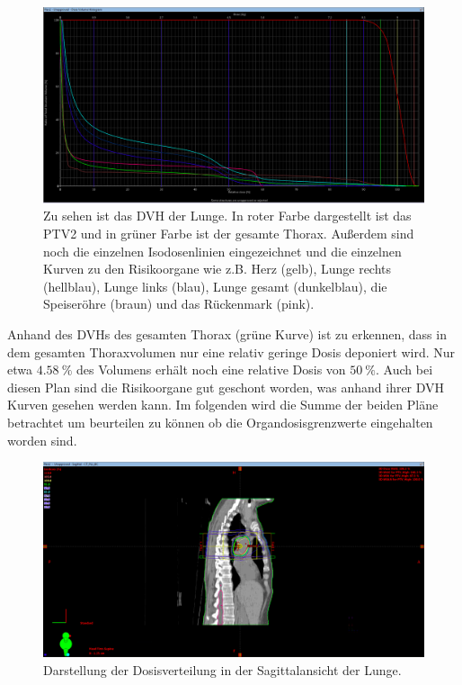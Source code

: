 \begin{figure}[H]
	\centering
	\includegraphics[width=\linewidth]{Bilder/Lunge2_DVH}
	\caption{Zu sehen ist das DVH der Lunge. In roter Farbe dargestellt ist das PTV2 und in grüner Farbe ist der gesamte Thorax. Außerdem sind noch die einzelnen Isodosenlinien eingezeichnet und die einzelnen Kurven zu den Risikoorgane wie z.B. Herz (gelb), Lunge rechts (hellblau), Lunge links (blau), Lunge gesamt (dunkelblau), die Speiseröhre (braun) und das Rückenmark (pink).}
	\label{fig:lunge2dvh}
\end{figure}

Anhand des DVHs des gesamten Thorax (grüne Kurve) ist zu erkennen, dass in dem gesamten Thoraxvolumen nur eine relativ geringe Dosis deponiert wird.
Nur etwa $\SI{4,58}{\percent}$ des Volumens erhält noch eine relative Dosis von $\SI{50}{\percent}$.
Auch bei diesen Plan sind die Risikoorgane gut geschont worden, was anhand ihrer DVH Kurven gesehen werden kann.
Im folgenden wird die Summe der beiden Pläne betrachtet um beurteilen zu können ob die Organdosisgrenzwerte eingehalten worden sind.

\begin{figure}[H]
	\centering
	\includegraphics[width=\linewidth]{Bilder/Lunge2_X}
	\caption{Darstellung der Dosisverteilung in der Sagittalansicht der Lunge.}
	\label{fig:lunge2x}
\end{figure}

